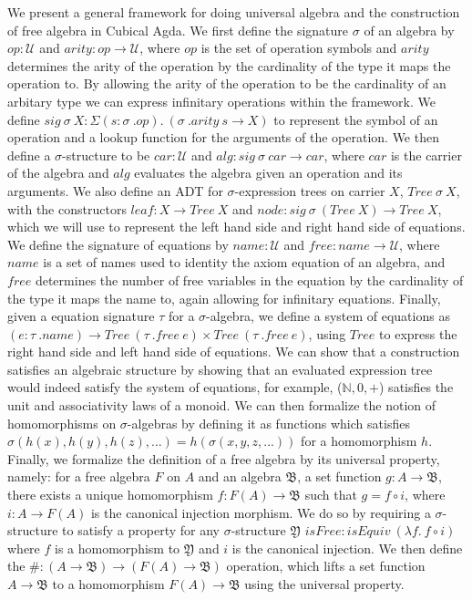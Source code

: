 \documentclass{article}
\begin{document}
We present a general framework for doing universal algebra and the construction of
free algebra in Cubical Agda. We first define the signature $\sigma$ of an algebra by $op : \mathcal{U}$ and
$arity : op \rightarrow \mathcal{U}$, where $op$ is the set of operation symbols and $arity$ determines
the arity of the operation by the cardinality of the type it maps the operation to. By allowing the arity
of the operation to be the cardinality of an arbitary type we can express infinitary operations within the framework.
We define $sig \: \sigma \: X : \Sigma( s : \sigma \: .op ). \: (\sigma \: .arity \: s \rightarrow X)$ to represent
the symbol of an operation and a lookup function for the arguments of the operation.
We then define a $\sigma$-structure to be $car : \mathcal{U}$ and $alg : sig \: \sigma \: car \rightarrow car$, where $car$
is the carrier of the algebra and $alg$ evaluates the algebra given an operation and its arguments. We also
define an ADT for $\sigma$-expression trees on carrier $X$, $Tree \: \sigma \: X$,
with the constructors $leaf : X \rightarrow Tree \: X$ and
$node : sig \: \sigma \: (Tree \: X) \rightarrow Tree \: X$, which we will use to represent
the left hand side and right hand side of equations. We define the signature of equations by 
$name : \mathcal{U}$ and $free : name \rightarrow \mathcal{U}$, where $name$ is a set of names used to identity
the axiom equation of an algebra, and $free$ determines the number of free variables in the equation by the
cardinality of the type it maps the name to, again allowing for infinitary equations. Finally, given a
equation signature $\tau$ for a $\sigma$-algebra, we define a system of equations as
$(e : \tau \: .name) \rightarrow Tree \: (\tau \: .free \: e) \times Tree \: (\tau \: .free \: e)$, using $Tree$
to express the right hand side and left hand side of equations.
We can show that a construction satisfies an algebraic structure by showing that an evaluated expression
tree would indeed satisfy the system of equations, for example, ($\mathbb{N},0,+$) satisfies the
unit and associativity laws of a monoid. We can then formalize the notion of homomorphisms on $\sigma$-algebras by 
defining it as functions which satisfies $\sigma(h(x),h(y),h(z),...) = h(\sigma(x,y,z,...))$ for
a homomorphism $h$. Finally, we formalize the definition of a free algebra
by its universal property, namely: for a free algebra $F$ on $A$ and an algebra $\mathfrak{B}$, a set function 
$g : A \rightarrow \mathfrak{B}$, there exists a unique homomorphism $f : F(A) \rightarrow \mathfrak{B}$ such that
$g = f \circ i$, where $i : A \rightarrow F(A)$ is the canonical injection morphism. We do so by requiring a
$\sigma$-structure to satisfy a property for any $\sigma$-structure $\mathfrak{Y}$
$isFree : isEquiv \: (\lambda f. \: f \circ i)$ where $f$ is a homomorphism to $\mathfrak{Y}$ and
$i$ is the canonical injection.
We then define the $\# : (A \rightarrow \mathfrak{B}) \rightarrow (F(A) \rightarrow \mathfrak{B})$ operation, which lifts
a set function $A \rightarrow \mathfrak{B}$ to a homomorphism $F(A) \rightarrow \mathfrak{B}$ using
the universal property.
\end{document}
